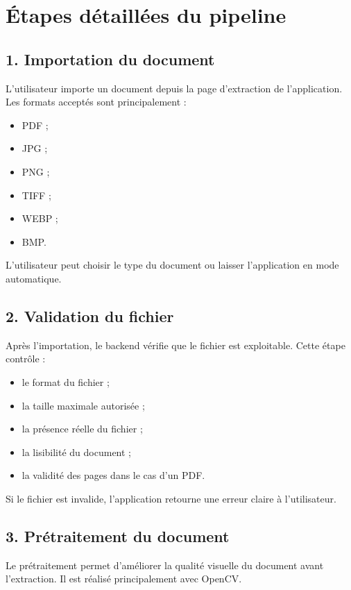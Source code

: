 \documentclass[12pt,a4paper]{report}
\begin{document}
\section*{Étapes détaillées du pipeline}

\subsection*{1. Importation du document}

L'utilisateur importe un document depuis la page d'extraction de l'application. Les formats acceptés sont principalement :

\begin{itemize}
    \item PDF ;
    \item JPG ;
    \item PNG ;
    \item TIFF ;
    \item WEBP ;
    \item BMP.
\end{itemize}

L'utilisateur peut choisir le type du document ou laisser l'application en mode automatique.

\subsection*{2. Validation du fichier}

Après l'importation, le backend vérifie que le fichier est exploitable. Cette étape contrôle :

\begin{itemize}
    \item le format du fichier ;
    \item la taille maximale autorisée ;
    \item la présence réelle du fichier ;
    \item la lisibilité du document ;
    \item la validité des pages dans le cas d'un PDF.
\end{itemize}

Si le fichier est invalide, l'application retourne une erreur claire à l'utilisateur.

\subsection*{3. Prétraitement du document}

Le prétraitement permet d'améliorer la qualité visuelle du document avant l'extraction. Il est réalisé principalement avec OpenCV.
\end{document}
